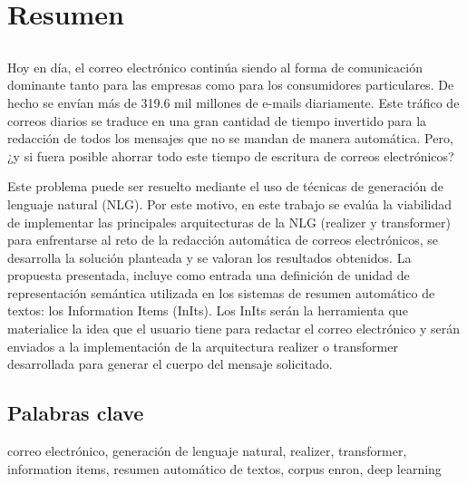 \chapter*{Resumen}

\section*{\tituloPortadaVal}

Hoy en día, el correo electrónico continúa siendo al forma de comunicación dominante tanto para las empresas como para los consumidores particulares. De hecho se envían más de 319.6 mil millones de e-mails diariamente. Este tráfico de correos diarios se traduce en una gran cantidad de tiempo invertido para la redacción de todos los mensajes que no se mandan de manera automática. Pero, ¿y si fuera posible ahorrar todo este tiempo de escritura de correos electrónicos?

Este problema puede ser resuelto mediante el uso de técnicas de generación de lenguaje natural (NLG). Por este motivo, en este trabajo se evalúa la viabilidad de implementar las principales arquitecturas de la NLG (realizer y transformer) para enfrentarse al reto de la redacción automática de correos electrónicos, se desarrolla la solución planteada y se valoran los resultados obtenidos. La propuesta presentada, incluye como entrada una definición de unidad de representación semántica utilizada en los sistemas de resumen automático de textos: los Information Items (InIts). Los InIts serán la herramienta que materialice la idea que el usuario tiene para redactar el correo electrónico y serán enviados a la implementación de la arquitectura realizer o transformer desarrollada para generar el cuerpo del mensaje solicitado.


\section*{Palabras clave}
   
\noindent correo electrónico, generación de lenguaje natural, realizer, transformer, information items, resumen automático de textos, corpus enron, deep learning

   


